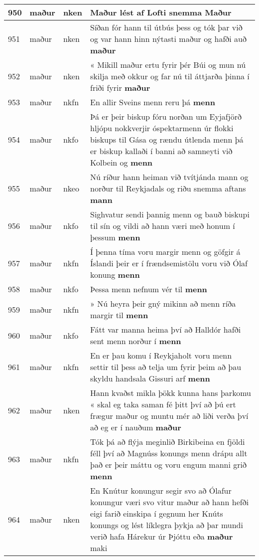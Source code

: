 \documentclass{article}
\begin{document}
\begin{longtable}{p{1cm}|p{1cm}|p{1cm}|p{13cm}}
\hline
950&maður&nken&Maður lést af Lofti snemma \textbf{Maður} \\
\hline
951&maður&nken&Síðan fór hann til útbús þess og tók þar við og var hann hinn nýtasti maður og hafði auð \textbf{maður} \\
\hline
952&maður&nken&« Mikill maður ertu fyrir þér Búi og mun nú skilja með okkur og far nú til áttjarða þinna í friði fyrir \textbf{maður} \\
\hline
953&maður&nkfn&En allir Sveins menn reru þá \textbf{menn} \\
\hline
954&maður&nkfo&Þá er þeir biskup fóru norðan um Eyjafjörð hljópu nokkverjir óspektarmenn úr flokki biskups til Gása og rændu útlenda menn þá er biskup kallaði í banni að samneyti við Kolbein og \textbf{menn} \\
\hline
955&maður&nkeo&Nú ríður hann heiman við tvítjánda mann og norður til Reykjadals og riðu snemma aftans \textbf{mann} \\
\hline
956&maður&nkfo&Sighvatur sendi þannig menn og bauð biskupi til sín og vildi að hann væri með honum í þessum \textbf{menn} \\
\hline
957&maður&nkfn&Í þenna tíma voru margir menn og göfgir á Íslandi þeir er í frændsemistölu voru við Ólaf konung \textbf{menn} \\
\hline
958&maður&nkfo&Þessa menn nefnum vér til \textbf{menn} \\
\hline
959&maður&nkfn&» Nú heyra þeir gný mikinn að menn ríða margir til \textbf{menn} \\
\hline
960&maður&nkfo&Fátt var manna heima því að Halldór hafði sent menn norður í \textbf{menn} \\
\hline
961&maður&nkfn&En er þau komu í Reykjaholt voru menn settir til þess að telja um fyrir þeim að þau skyldu handsala Gissuri arf \textbf{menn} \\
\hline
962&maður&nken&Hann kvaðst mikla þökk kunna hans þarkomu « skal eg taka saman fé þitt því að þú ert frægur maður og muntu mér að liði verða því að eg er í nauðum \textbf{maður} \\
\hline
963&maður&nkfn&Tók þá að flýja meginlið Birkibeina en fjöldi féll því að Magnúss konungs menn drápu allt það er þeir máttu og voru engum manni grið \textbf{menn} \\
\hline
964&maður&nken&En Knútur konungur segir svo að Ólafur konungur væri svo vitur maður að hann hefði eigi farið einskipa í gegnum her Knúts konungs og lést líklegra þykja að þar mundi verið hafa Hárekur úr Þjóttu eða \textbf{maður} maki\\

\end{longtable}
\end{document}
